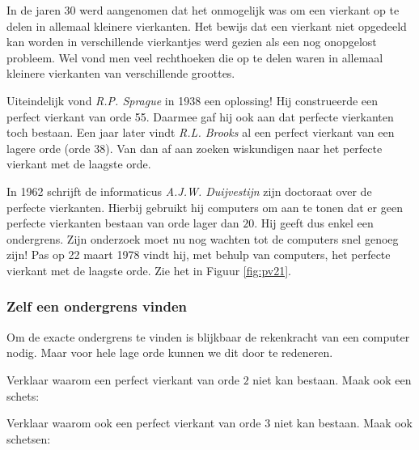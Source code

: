 In de jaren 30 werd aangenomen dat het onmogelijk was om een vierkant op te delen in allemaal kleinere vierkanten. Het bewijs dat een vierkant niet opgedeeld kan worden in verschillende vierkantjes werd gezien als een nog onopgelost probleem. Wel vond men veel rechthoeken die op te delen waren in allemaal kleinere vierkanten van verschillende groottes.

Uiteindelijk vond {\it R.P. Sprague} in 1938 een oplossing! Hij construeerde een perfect vierkant van orde 55. Daarmee gaf hij ook aan dat perfecte vierkanten toch bestaan. Een jaar later vindt {\it R.L. Brooks} al een perfect vierkant van een lagere orde (orde 38). Van dan af aan zoeken wiskundigen naar het perfecte vierkant met de laagste orde.

In 1962 schrijft de informaticus {\it A.J.W. Duijvestijn} zijn doctoraat over de perfecte vierkanten. Hierbij gebruikt hij computers om aan te tonen dat er geen perfecte vierkanten bestaan van orde lager dan $20$. Hij geeft dus enkel een ondergrens. Zijn onderzoek moet nu nog wachten tot de computers snel genoeg zijn! Pas op 22 maart 1978 vindt hij, met behulp van computers, het perfecte vierkant met de laagste orde. Zie het in Figuur \ref{fig:pv21}.

\subsubsection{Zelf een ondergrens vinden}

Om de exacte ondergrens te vinden is blijkbaar de rekenkracht van een computer nodig. Maar voor hele lage orde kunnen we dit door te redeneren.

Verklaar waarom een perfect vierkant van orde $2$ niet kan bestaan. Maak ook een schets:


Verklaar waarom ook een perfect vierkant van orde $3$ niet kan bestaan. Maak ook schetsen:


